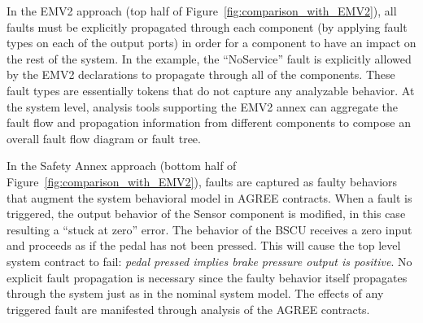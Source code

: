 In the EMV2 approach (top half of Figure~\ref{fig:comparison_with_EMV2}), all faults must be explicitly propagated through each component (by applying fault types on each of the output ports) in order for a component to have an impact on the rest of the system. In the example, the ``NoService'' fault is explicitly allowed by the EMV2 declarations to propagate through all of the components.  These fault types are essentially tokens that do not capture any analyzable behavior.  At the system level, analysis tools supporting the EMV2 annex can aggregate the fault flow and propagation information from different components to compose an overall fault flow diagram or fault tree.

In the Safety Annex approach (bottom half of Figure~\ref{fig:comparison_with_EMV2}), faults are captured as faulty behaviors that augment the system behavioral model in AGREE contracts.  When a fault is triggered, the output behavior of the Sensor component is modified, in this case resulting a ``stuck at zero'' error. The behavior of the BSCU receives a zero input and proceeds as if the pedal has not been pressed. This will cause the top level system contract to fail: {\em pedal pressed implies brake pressure output is positive}. No explicit fault propagation is necessary since the faulty behavior itself propagates through the system just as in the nominal system model. The effects of any triggered fault are manifested through analysis of the AGREE contracts. 




